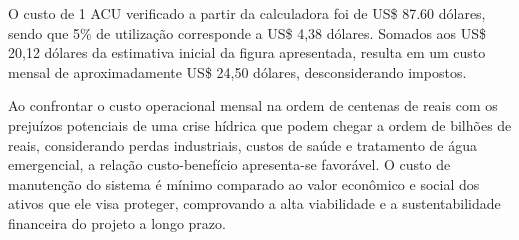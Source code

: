 O custo de 1 ACU verificado a partir da calculadora foi de US\$ 87.60 dólares, sendo que 5\% de utilização corresponde a US\$ 4,38 dólares. Somados aos US\$ 20,12 dólares da estimativa inicial da figura apresentada, resulta em um custo mensal de aproximadamente US\$ 24,50 dólares, desconsiderando impostos. 

Ao confrontar o custo operacional mensal na ordem de centenas de reais com os prejuízos potenciais de uma crise hídrica que podem chegar a ordem de bilhões de reais, considerando perdas industriais, custos de saúde e tratamento de água emergencial, a relação custo-benefício apresenta-se favorável. O custo de manutenção do sistema é mínimo comparado ao valor econômico e social dos ativos que ele visa proteger, comprovando a alta viabilidade e a sustentabilidade financeira do projeto a longo prazo.

